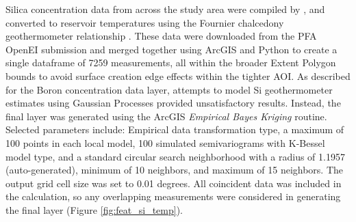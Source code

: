 Silica concentration data from across the study area were compiled by \citet{bielicki_hydrogeolgic_2015}, and converted to reservoir temperatures using the Fournier chalcedony geothermometer relationship \citep{fournier_chemical_1977}. These data were downloaded from the PFA OpenEI submission \citep{kelley_geothermal_2015} and merged together using ArcGIS and Python to create a single dataframe of 7259 measurements, all within the broader Extent Polygon bounds to avoid surface creation edge effects within the tighter AOI. As described for the Boron concentration data layer, attempts to model Si geothermometer estimates using Gaussian Processes provided unsatisfactory results. Instead, the final layer was generated using the ArcGIS \textit{Empirical Bayes Kriging} routine. Selected parameters include: Empirical data transformation type, a maximum of 100 points in each local model, 100 simulated semivariograms with K-Bessel model type, and a standard circular search neighborhood with a radius of 1.1957 (auto-generated), minimum of 10 neighbors, and maximum of 15 neighbors. The output grid cell size was set to 0.01 degrees. All coincident data was included in the calculation, so any overlapping measurements were considered in generating the final layer (Figure \ref{fig:feat_si_temp}).

